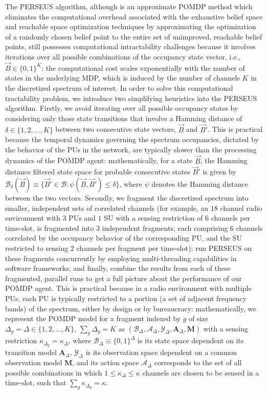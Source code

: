 \documentclass[12pt, draftcls, onecolumn]{IEEEtran}
\begin{document}
The PERSEUS algorithm, although is an approximate POMDP method which eliminates the computational overhead associated with the exhaustive belief space and reachable space optimization techniques \cite{PUOccupancy:18,PUOccupancy:17} by approximating the optimization of a randomly chosen belief point to the entire set of unimproved, reachable belief points, still possesses computational intractability challenges because it involves iterations over all possible combinations of the occupancy state vector, i.e., $\vec{B}{\in}\{0,1\}^{K}$: the computational cost scales exponentially with the number of states in the underlying MDP, which is induced by the number of channels $K$ in the discretized spectrum of interest. In order to solve this computational tractability problem, we introduce two simplifying heuristics into the PERSEUS algorithm. Firstly, we avoid iterating over all possible occupancy states by considering only those state transitions that involve a Hamming distance of $\delta{\in}\{1,2,\dots,K\}$ between two consecutive state vectors, $\vec{B}$ and $\vec{B}'$. This is practical because the temporal dynamics governing the spectrum occupancies, dictated by the behavior of the PUs in the network, are typically slower than the processing dynamics of the POMDP agent: mathematically, for a state $\vec{B}$, the Hamming distance filtered state space for probable consecutive states $\vec{B}'$ is given by $\mathcal{B}_{\delta}(\vec{B}){\equiv}\{\vec{B}'{\in}\mathcal{B}:\psi(\vec{B},\vec{B}'){\leq}\delta\}$, where $\psi$ denotes the Hamming distance between the two vectors. Secondly, we fragment the discretized spectrum into smaller, independent sets of correlated channels (for example, an $18$ channel radio environment with $3$ PUs and $1$ SU with a sensing restriction of $6$ channels per time-slot, is fragmented into $3$ independent fragments, each comprising $6$ channels correlated by the occupancy behavior of the corresponding PU, and the SU restricted to sensing $2$ channels per fragment per time-slot); run PERSEUS on these fragments concurrently by employing multi-threading capabilities in software frameworks; and finally, combine the results from each of these fragmented, parallel runs to get a full picture about the performance of our POMDP agent. This is practical because in a radio environment with multiple PUs, each PU is typically restricted to a portion (a set of adjacent frequency bands) of the spectrum, either by design or by bureaucracy: mathematically, we represent the POMDP model for a fragment indexed by $g$ of size $\Delta_{g}{=}\Delta{\in}\{1,2,\dots,K\},\ \sum_{g} \Delta_{g}{=}K$ as $(\mathcal{B}_{\Delta},\mathcal{A}_{\Delta},\mathcal{Y}_{\Delta},\mathbf{A}_{\Delta},\mathbf{M})$ with a sensing restriction $\kappa_{\Delta_{g}}{=}\kappa_{\Delta}$, where $\mathcal{B}_{\Delta}{\equiv}\{0,1\}^{\Delta}$ is its state space dependent on its transition model $\mathbf{A}_{\Delta}$, $\mathcal{Y}_{\Delta}$ is its observation space dependent on a common observation model $\mathbf{M}$, and its action space $\mathcal{A}_{\Delta}$ corresponds to the set of all possible combinations in which $1{\leq}\kappa_{\Delta}{\leq}\kappa$ channels are chosen to be sensed in a time-slot, such that $\sum_{g}\kappa_{\Delta_{g}}{=}\kappa$.
\end{document}
